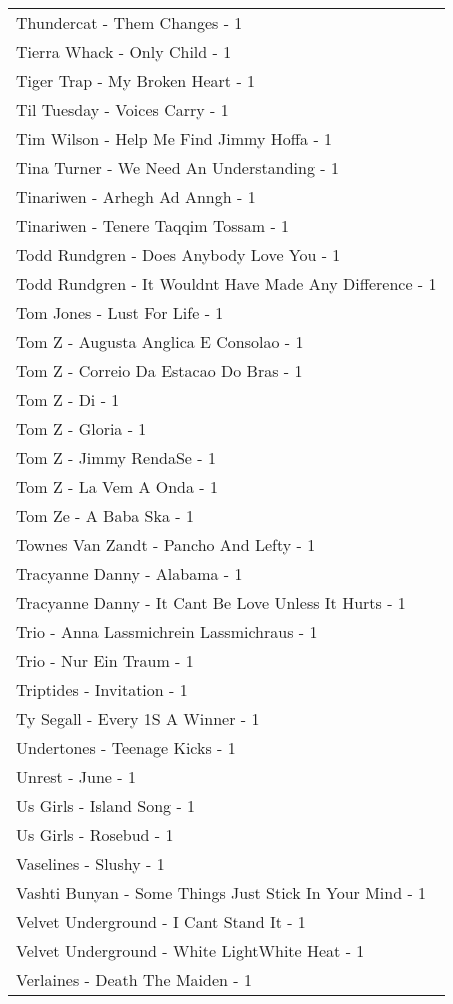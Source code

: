 \documentclass[
]{article}
\begin{document}
\begin{longtable}{l}
Thundercat - Them Changes - 1 \\ 
Tierra Whack - Only Child - 1 \\ 
Tiger Trap - My Broken Heart - 1 \\ 
Til Tuesday - Voices Carry - 1 \\ 
Tim Wilson - Help Me Find Jimmy Hoffa - 1 \\ 
Tina Turner - We Need An Understanding - 1 \\ 
Tinariwen - Arhegh Ad Anngh - 1 \\ 
Tinariwen - Tenere Taqqim Tossam - 1 \\ 
Todd Rundgren - Does Anybody Love You - 1 \\ 
Todd Rundgren - It Wouldnt Have Made Any Difference - 1 \\ 
Tom Jones - Lust For Life - 1 \\ 
Tom Z - Augusta Anglica E Consolao - 1 \\ 
Tom Z - Correio Da Estacao Do Bras - 1 \\ 
Tom Z - Di - 1 \\ 
Tom Z - Gloria - 1 \\ 
Tom Z - Jimmy RendaSe - 1 \\ 
Tom Z - La Vem A Onda - 1 \\ 
Tom Ze - A Baba Ska - 1 \\ 
Townes Van Zandt - Pancho And Lefty - 1 \\ 
Tracyanne Danny - Alabama - 1 \\ 
Tracyanne Danny - It Cant Be Love Unless It Hurts - 1 \\ 
Trio - Anna Lassmichrein Lassmichraus - 1 \\ 
Trio - Nur Ein Traum - 1 \\ 
Triptides - Invitation - 1 \\ 
Ty Segall - Every 1S A Winner - 1 \\ 
Undertones - Teenage Kicks - 1 \\ 
Unrest - June - 1 \\ 
Us Girls - Island Song - 1 \\ 
Us Girls - Rosebud - 1 \\ 
Vaselines - Slushy - 1 \\ 
Vashti Bunyan - Some Things Just Stick In Your Mind - 1 \\ 
Velvet Underground - I Cant Stand It - 1 \\ 
Velvet Underground - White LightWhite Heat - 1 \\ 
Verlaines - Death The Maiden - 1 \\ 

\end{longtable}
\end{document}
